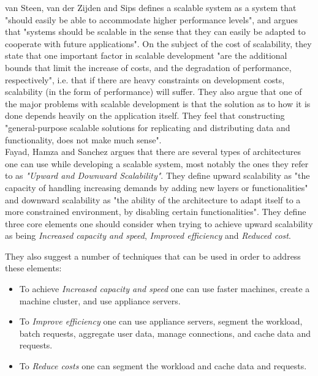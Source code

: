 \documentclass{article}
\begin{document}
van Steen, van der Zijden and Sips\cite{van1998software} defines a scalable
system as a system that "should easily be able to accommodate higher
performance levels", and argues that "systems should be scalable in the sense
that they can easily be adapted to cooperate with future applications".  On the
subject of the cost of scalability, they state that one important factor in
scalable development "are the additional bounds that limit the increase of
costs, and the degradation of performance, respectively", i.e. that if there
are heavy constraints on development costs, scalability (in the form of
performance) will suffer.  They also argue that one of the major problems with
scalable development is that the solution as to how it is done depends heavily
on the application itself.  They feel that constructing "general-purpose
scalable solutions for replicating and distributing data and functionality,
does not make much sense".
\\

Fayad, Hamza and Sanchez \cite{fayad2005towards} argues that there are several
types of architectures one can use while developing a scalable system, most
notably the ones they refer to as \emph{"Upward and Downward Scalability"}.
They define upward scalability as "the capacity of handling increasing demands
by adding new layers or functionalities" and downward scalability as "the
ability of the architecture to adapt itself to a more constrained environment,
by disabling certain functionalities".
They define three core elements one should consider when trying to achieve
upward scalability as being \emph{Increased capacity and speed}, \emph{Improved
efficiency} and \emph{Reduced cost}. 

They also suggest a number of techniques that can be used in order to address
these elements: 
\begin{itemize}
\item{To achieve \emph{Increased capacity and speed} one can use faster
machines, create a machine cluster, and use appliance servers.} 
\item{To \emph{Improve efficiency} one can use appliance servers, segment the
workload, batch requests, aggregate user data, manage connections, and cache
data and requests.}  
\item{To \emph{Reduce costs} one can segment the workload and cache data and
requests.}
\end{itemize}
\end{document}
